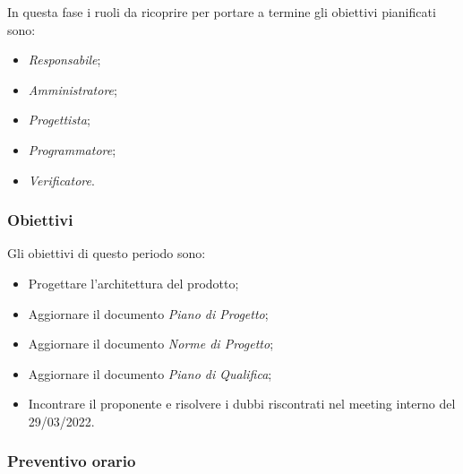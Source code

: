 In questa fase i ruoli da ricoprire per portare a termine gli obiettivi pianificati sono:
\begin{itemize}
    \item \textit{Responsabile};
    \item \textit{Amministratore};
    \item \textit{Progettista};
    \item \textit{Programmatore};
    \item \textit{Verificatore}.
\end{itemize}

\subsubsection{Obiettivi}
Gli obiettivi di questo periodo sono:
\begin{itemize}
    \item Progettare l'architettura del prodotto;
    \item Aggiornare il documento \textit{Piano di Progetto};
    \item Aggiornare il documento \textit{Norme di Progetto};
    \item Aggiornare il documento \textit{Piano di Qualifica};
    \item Incontrare il proponente e risolvere i dubbi riscontrati nel meeting interno del 29/03/2022.
\end{itemize}

\subsubsection{Preventivo orario}

